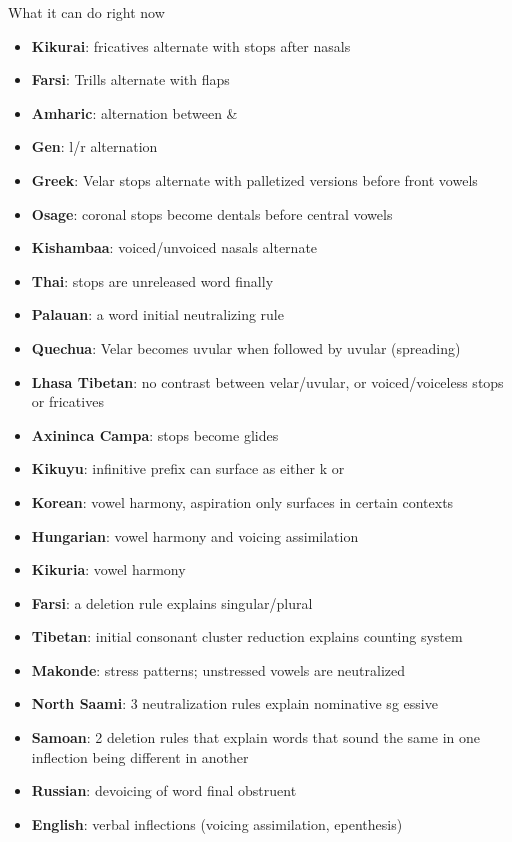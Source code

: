 \documentclass{beamer}
\begin{document}
\begin{frame}{What it can do right now}
\tiny  \begin{itemize}
\item \textbf{ Kikurai}: fricatives alternate with stops after nasals
\item \textbf{ Farsi}: Trills alternate with flaps
\item \textbf{ Amharic}: alternation between  \& 
\item \textbf{ Gen}: l/r alternation
\item \textbf{ Greek}: Velar stops alternate with palletized versions before front vowels
  \item \textbf{ Osage}: coronal stops become dentals before central vowels
\item \textbf{ Kishambaa}: voiced/unvoiced nasals alternate
\item \textbf{  Thai}: stops are unreleased word finally
\item \textbf{ Palauan}: a word initial neutralizing rule
\item \textbf{ Quechua}: Velar becomes uvular when followed by uvular (spreading)
\item \textbf{ Lhasa Tibetan}: no contrast between velar/uvular, or voiced/voiceless stops or fricatives
\item \textbf{ Axininca Campa}: stops become glides
\item \textbf{ Kikuyu}: infinitive prefix can surface as either k or 
\item \textbf{ Korean}: vowel harmony, aspiration only surfaces in certain contexts
\item \textbf{ Hungarian}: vowel harmony and voicing assimilation
\item \textbf{ Kikuria}: vowel harmony
\item \textbf{ Farsi}: a deletion rule explains singular/plural
\item \textbf{ Tibetan}: initial consonant cluster reduction explains counting system
\item \textbf{ Makonde}: stress patterns; unstressed vowels are neutralized
\item \textbf{ North Saami}: 3 neutralization rules explain nominative sg essive
\item \textbf{ Samoan}: 2 deletion rules that explain words that sound the same in one inflection being different in another
\item \textbf{     Russian}: devoicing of word final obstruent
\item \textbf{ English}: verbal inflections (voicing assimilation, epenthesis)

\end{itemize}
\end{frame}
\end{document}
